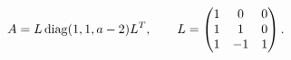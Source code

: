\documentclass[preview]{standalone}
\begin{document}
\begin{align*}
\special{dvisvgm:raw <g id='unique000'>}A=L\operatorname{diag}(1,1,a-2)L^T,\qquad L=\begin{pmatrix}1&0&0\\1&1&0\\1&-1&1\end{pmatrix}.\special{dvisvgm:raw </g>}
\end{align*}
\end{document}
